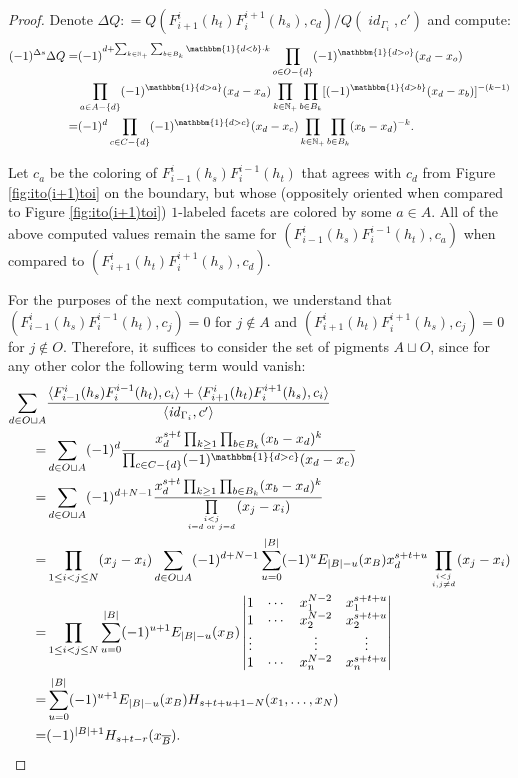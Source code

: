\documentclass[12pt]{amsart}
\theoremstyle{definition}
\theoremstyle{remark}
\numberwithin{equation}{section}
\numberwithin{figure}{section}
\DeclareMathOperator{\idfoam}{\mathit{id}}
\begin{document}
\begin{proof}
  Denote $\Delta Q : = Q(F_{i+1}^i(h_t)F_i^{i+1}(h_s), c_d)/Q(\idfoam_{\Gamma_i},c')$ and compute: 
  \begin{align*}
    (-1)^{\Delta s}\Delta Q
    =&(-1)^{d+\sum_{k\in\mathbb{N}_+}\sum_{b\in B_k}\mathbbm{1}\{d<b\}\cdot k}\prod_{o\in O- \{d\}}(-1)^{\mathbbm{1}\{d>o\}}(x_d-x_o)\\
    &\prod_{a\in A- \{d\}}(-1)^{\mathbbm{1}\{d>a\}}(x_d-x_a)\prod_{k\in\mathbb{N}_+}\prod_{b\in B_k}[(-1)^{\mathbbm{1}\{d>b\}}(x_d-x_b)]^{-(k-1)}\\
    =&(-1)^d\prod_{c\in C- \{d\}}(-1)^{\mathbbm{1}\{d>c\}}(x_d-x_c)\prod_{k\in\mathbb{N}_+}\prod_{b\in B_k}(x_b-x_d)^{-k}.
  \end{align*}
  
Let $c_a$ be the coloring of $F_{i-1}^i(h_s)F_i^{i-1}(h_t)$ that agrees with $c_d$ from Figure \ref{fig:ito(i+1)toi} on the boundary, but whose (oppositely oriented when compared to Figure \ref{fig:ito(i+1)toi}) $1$-labeled facets are colored by some $a \in A$. All of the above computed values remain the same for $(F_{i-1}^i(h_s)F_i^{i-1}(h_t), c_a)$ when compared to $(F_{i+1}^i(h_t)F_i^{i+1}(h_s), c_d)$. 

For the purposes of the next computation, we understand that $(F_{i-1}^i(h_s)F_i^{i-1}(h_t), c_j) = 0$ for $j\notin A$ and $(F_{i+1}^i(h_t)F_i^{i+1}(h_s), c_j) = 0$ for $j\notin O$. Therefore, it suffices to consider the set of pigments $A \sqcup O$, since for any other color the following term would vanish:
  \begin{align*}
    \sum_{d\in O\sqcup A} & \frac{\langle F_{i-1}^i(h_s)F_i^{i-1}(h_t), c_i\rangle  +  \langle F_{i+1}^i(h_t)F_i^{i+1}(h_s), c_i \rangle}   {\langle \idfoam_{\Gamma_i}, c' \rangle} \\
    =& \sum_{d\in O\sqcup A}(-1)^d\frac{x_d^{s+t}\prod_{k\geq1}\prod_{b\in B_k}(x_b-x_d)^{k}}{\prod_{c\in C- \{d\}}(-1)^{\mathbbm{1}\{d>c\}}(x_d-x_c)}\\
    =&\sum_{d\in O\sqcup A}(-1)^{d+N-1}\frac{x_d^{s+t}\prod_{k\geq1}\prod_{b\in B_k}(x_b-x_d)^{k}}{\prod\limits_{i<j\atop i=d\text{ or }j=d}(x_j-x_i)}\\
    =&\prod_{1\leq i<j\leq N}(x_j-x_i)\sum_{d\in O\sqcup A}(-1)^{d+N-1}\sum_{u=0}^{|B|}(-1)^u E_{|B|-u}(x_B) x_d^{s+t+u}\prod\limits_{i<j\atop i,j\neq d}(x_j-x_i)\\
    =&\prod_{1\leq i<j\leq N}\sum_{u=0}^{|B|}(-1)^{u+1} E_{|B|-u}(x_B) 
    \begin{vmatrix}
    1 & \cdots & x_1^{N-2} & x_1^{s+t+u}\\
    1 & \cdots & x_2^{N-2} & x_2^{s+t+u}\\
    \vdots & & \vdots & \vdots \\
    1 & \cdots & x_n^{N-2} & x_n^{s+t+u}
    \end{vmatrix}\\
    =&\sum_{u=0}^{|B|}(-1)^{u+1}E_{|B|-u}(x_B)H_{s+t+u+1-N}(x_1, \ldots, x_N)\\
    =&(-1)^{|B| + 1}H_{s+t-r}(x_{\overline{B}}).
  \end{align*}
 

\end{proof}
\end{document}
